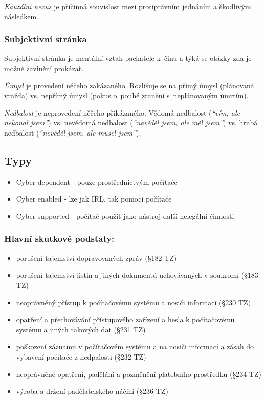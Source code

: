 \emph{Kauzální nexus} je příčinná souvislost mezi protiprávním jednáním a škodlivým následkem.


\subsubsection{Subjektivní stránka}

Subjektivní stránka je mentální vztah pachatele k~činu a týká se otázky zda je možné zavinění prokázat.

\emph{Úmysl} je provedení něčeho zakázaného.
Rozlišuje se na přímý úmysl (plánovaná vražda) vs. nepřímý úmysl (pokus o~pouhé zranění s~neplánovaným úmrtím).

\emph{Nedbalost} je neprovedení něčeho přikázaného.
Vědomá nedbalost (\emph{\enquote{vím, ale nekonal jsem}}) vs. nevědomá nedbalost (\emph{\enquote{nevěděl jsem, ale měl jsem}}) vs. hrubá nedbalost (\emph{\enquote{nevěděl jsem, ale musel jsem}}).

\subsection{Typy}
\begin{itemize}
    \item Cyber dependent - pouze prostřednictvým počítače
    \item Cyber enabled - lze jak IRL, tak pomocí počítače
    \item Cyber supported - počítač použit jako nástroj další nelegální činnosti
\end{itemize}

\subsubsection{Hlavní skutkové podstaty:}
\begin{itemize}
    \item porušení tajemství dopravovaných zpráv (§182 TZ)
    \item porušení tajemství listin a jiných dokumentů uchovávaných v soukromí (§183 TZ)
    \item neoprávněný přístup k počítačovému systému a nosiči informací (§230 TZ)
    \item opatření a přechovávání přístupového zařízení a hesla k počítačovému systému a jiných takových dat (§231 TZ)
    \item poškození záznamu v počítačovém systému a na nosiči informací a zásah do vybavení počítače z nedpalosti (§232 TZ)
    \item neoprávněné opatření, padělání a pozměnění platebního prostředku (§234 TZ)
    \item výroba a držení padělatelského náčiní (§236 TZ)
\end{itemize}

